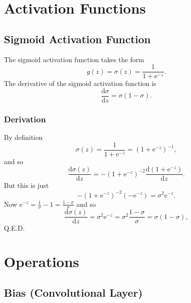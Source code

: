 \documentclass[modern]{aastex61}
\newcommand{\ue}{\mathrm{e}}
\newcommand{\uderivative}{\mathrm{d}}
\begin{document}
\section{Activation Functions} \label{sec:act}

\subsection{Sigmoid Activation Function} \label{sec:sigmoid}

The sigmoid activation function takes the form
\begin{equation} \label{eq:sigmoid}
  g(z) = \sigma(z) = \frac{1}{1 + \ue^{-z}}.
\end{equation}
The derivative of the sigmoid activation function is
\begin{equation} \label{eq:sigmoidderivative}
  \frac{\uderivative \sigma}{\uderivative z} = \sigma(1 - \sigma).
\end{equation}

\subsubsection{Derivation}

By definition
\begin{equation*}
  \sigma(z) = \frac{1}{1 + \ue^{-z}} = (1 + \ue^{-z})^{-1},
\end{equation*}
and so
\begin{equation*}
  \frac{\uderivative \sigma(z)}{\uderivative z} = -(1 + \ue^{-z})^{-2} \frac{\uderivative (1 + \ue^{-z}) }{\uderivative z}.
\end{equation*}
But this is just
\begin{equation*}
  -(1 + \ue^{-z})^{-2} (-\ue^{-z}) = \sigma^{2} \ue^{-z}.
\end{equation*}
Now $\ue^{-z} = \frac{1}{\sigma} - 1 = \frac{1 - \sigma}{\sigma}$ and so
\begin{equation*}
  \frac{\uderivative \sigma(z)}{\uderivative z} = \sigma^{2} \ue^{-z} = \sigma^{2} \frac{1 - \sigma}{\sigma} = \sigma (1 - \sigma),
\end{equation*}
Q.E.D.

\section{Operations} \label{sec:op}

\subsection{Bias (Convolutional Layer)} \label{sec:bias}
\end{document}
